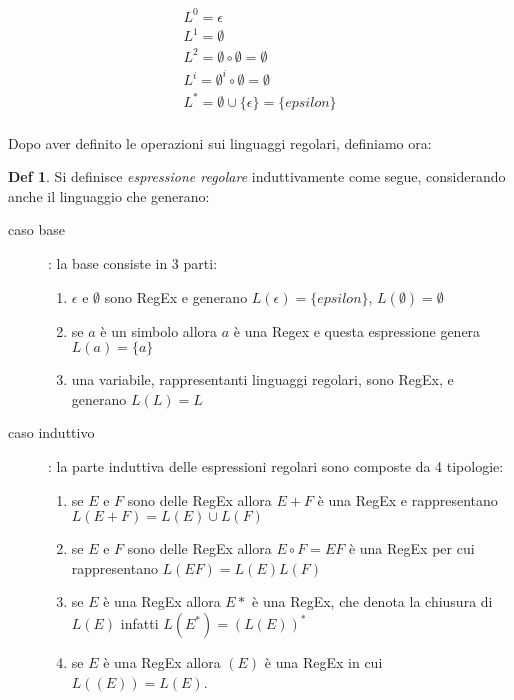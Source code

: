 \documentclass[a4paper]{report}
\theoremstyle{definition}%
\newtheorem*{defi}{Def}%
\begin{document}
\begin{itemize}
\begin{itemize}
      \begin{equation*}
      \begin{split}
      L^0 = \epsilon \\
      L^1 = \emptyset \\
      L^2 = \emptyset \circ \emptyset = \emptyset \\
      L^i = \emptyset^i \circ \emptyset = \emptyset \\
      L^* = \emptyset \cup \{\epsilon\} = \{epsilon\} \\
      \end{split}
      \end{equation*}
    \end{itemize}
  \end{itemize}
  
    Dopo aver definito le operazioni sui linguaggi regolari, definiamo ora:
    \begin{defi}
      Si definisce \emph{espressione regolare} induttivamente come segue, considerando anche il linguaggio che generano:
      \begin{description}
      \item [caso base]: la base consiste in 3 parti:
        \begin{enumerate}
        \item $\epsilon$ e $\emptyset$ sono RegEx e generano $L(\epsilon) = \{epsilon\}$, $L(\emptyset) = \emptyset$
        \item se $a$ è un simbolo allora $a$ è una Regex e questa espressione genera $L(a) = \{a\}$
        \item una variabile, rappresentanti linguaggi regolari, sono RegEx, e generano $L(L) = L$
          \end{enumerate}

      \item [caso induttivo]: la parte induttiva delle espressioni regolari sono composte da 4 tipologie:
        \begin{enumerate}
        \item se $E$ e $F$ sono delle RegEx allora $E + F$ è una RegEx e rappresentano $L(E + F) = L(E) \cup L(F)$
        \item se $E$ e $F$ sono delle RegEx allora $E \circ F = EF$ è una RegEx per cui rappresentano $L(EF) = L(E)L(F)$
        \item se $E$ è una RegEx allora $E*$ è una RegEx, che denota la chiusura di $L(E)$ infatti $L(E^*) = (L(E))^*$
        \item se $E$ è una RegEx allora $(E)$ è una RegEx in cui $L((E)) = L(E)$.
        \end{enumerate}
      \end{description}
   \end{defi}
            
\end{document}
